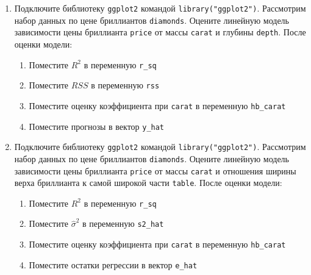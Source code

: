 \documentclass[10pt,a4paper]{article}
\begin{document}
\begin{enumerate}
\item Подключите библиотеку \verb|ggplot2| командой \verb|library("ggplot2")|. Рассмотрим набор данных по цене бриллиантов \verb|diamonds|. Оцените линейную модель зависимости цены бриллианта \verb|price| от массы \verb|carat| и глубины \verb|depth|. После оценки модели:
\begin{enumerate}
\item Поместите $R^2$ в переменную \verb|r_sq|
\item Поместите $RSS$ в переменную \verb|rss|
\item Поместите оценку коэффициента при \verb|carat| в переменную \verb|hb_carat|
\item Поместите прогнозы в вектор \verb|y_hat|
\end{enumerate}


\vspace{2in}

\item Подключите библиотеку \verb|ggplot2| командой \verb|library("ggplot2")|. Рассмотрим набор данных по цене бриллиантов \verb|diamonds|. Оцените линейную модель зависимости цены бриллианта \verb|price| от массы \verb|carat| и отношения ширины верха бриллианта к самой широкой части \verb|table|. После оценки модели:
\begin{enumerate}
\item Поместите $R^2$ в переменную \verb|r_sq|
\item Поместите $\hat{\sigma}^2$ в переменную \verb|s2_hat|
\item Поместите оценку коэффициента при \verb|carat| в переменную \verb|hb_carat|
\item Поместите остатки регрессии в вектор \verb|e_hat|
\end{enumerate}

\end{enumerate}
\end{document}
